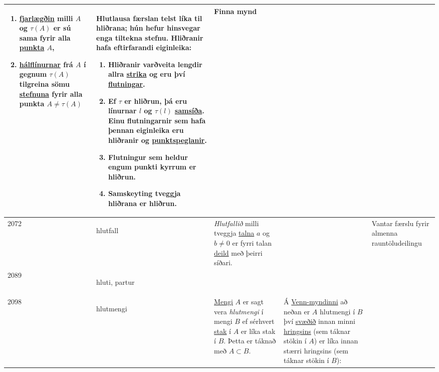\begin{longtable}{p{} | p{} | p{} | p{} | p{}}
\begin{enumerate}
    \item \hyperlink{row:1204}{fjarlægðin} milli \(A\) og \(\tau(A)\) er sú sama fyrir alla \hyperlink{row:4001}{punkta} \(A\),
    \item \hyperlink{row:1840}{hálflínurnar} frá \(A\) í gegnum \(\tau(A)\) tilgreina sömu \hyperlink{row:5135}{stefnuna} fyrir alla punkta \(A \neq \tau(A)\)
\end{enumerate} & Hlutlausa færslan telst líka til hliðrana; hún hefur hinsvegar enga tiltekna stefnu. Hliðranir hafa eftirfarandi eiginleika:

\begin{enumerate}
    \item Hliðranir varðveita lengdir allra \hyperlink{row:2958}{strika} og eru því \hyperlink{row:1328}{flutningar}.
    \item Ef \(\tau\) er hliðrun, þá eru línurnar \(l\) og \(\tau(l)\) \hyperlink{row:4509}{samsíða}. Einu flutningarnir sem hafa þennan eiginleika eru hliðranir og \hyperlink{row:0}{punktspeglanir}.
    \item Flutningur sem heldur engum punkti kyrrum er hliðrun.
    \item Samskeyting tveggja hliðrana er hliðrun.
\end{enumerate} & Finna mynd \\
\hline
2072 & \hypertarget{row:2072}{hlutfall} & \textit{Hlutfallið} milli tveggja \hyperlink{row:5397}{talna} \(a\) og \(b \neq 0\) er fyrri talan \hyperlink{row:0}{deild} með þeirri síðari. &  & Vantar færslu fyrir almenna rauntöludeilingu \\
\hline
2089 & \hypertarget{row:2089}{hluti, partur} &  &  &  \\
\hline
2098 & \hypertarget{row:2098}{hlutmengi} & \hyperlink{row:3270}{Mengi} \(A\) er sagt vera \textit{hlutmengi} í mengi \(B\) ef sérhvert \hyperlink{row:5128}{stak} í \(A\) er líka stak í \(B\). Þetta er táknað með \(A \subset B\). & Á \hyperlink{row:6050}{Venn-myndinni} að neðan er \(A\) hlutmengi í \(B\) því \hyperlink{row:5335}{svæðið} innan minni \hyperlink{row:2295}{hringsins} (sem táknar stökin í \(A\)) er líka innan stærri hringsins (sem táknar stökin í \(B\)):


\end{longtable}
